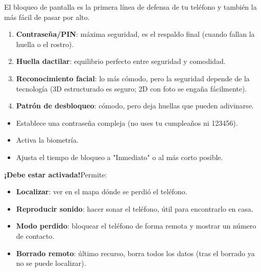 


El bloqueo de pantalla es la primera línea de defensa de tu teléfono y también la más fácil de pasar por alto.


\begin{enumerate}
  \item \textbf{Contraseña/PIN}: máxima seguridad, es el respaldo final (cuando fallan la huella o el rostro).
  \item \textbf{Huella dactilar}: equilibrio perfecto entre seguridad y comodidad.
  \item \textbf{Reconocimiento facial}: lo más cómodo, pero la seguridad depende de la tecnología (3D estructurado es seguro; 2D con foto se engaña fácilmente).
  \item \textbf{Patrón de desbloqueo}: cómodo, pero deja huellas que pueden adivinarse.
\end{enumerate}


\begin{itemize}
  \item Establece una contraseña compleja (no uses tu cumpleaños ni 123456).
  \item Activa la biometría.
  \item Ajusta el tiempo de bloqueo a "Inmediato" o al más corto posible.
\end{itemize}


\textbf{¡Debe estar activada!}Permite:

\begin{itemize}
  \item \textbf{Localizar}: ver en el mapa dónde se perdió el teléfono.
  \item \textbf{Reproducir sonido}: hacer sonar el teléfono, útil para encontrarlo en casa.
  \item \textbf{Modo perdido}: bloquear el teléfono de forma remota y mostrar un número de contacto.
  \item \textbf{Borrado remoto}: último recurso, borra todos los datos (tras el borrado ya no se puede localizar).
\end{itemize}

